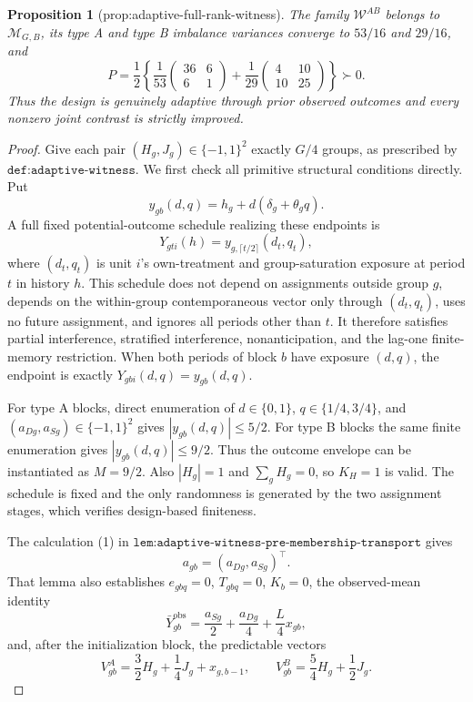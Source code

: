 \documentclass{article}
\newtheorem{proposition}{Proposition}
\begin{document}
\begin{proposition}[prop:adaptive-full-rank-witness]\label{prop:adaptive-full-rank-witness}
The family \(\mathcal W^{AB}\) belongs to \(\mathcal M_{G,B}\), its type A and type B imbalance variances converge to \(53/16\) and \(29/16\), and \[P=\frac12\left\{\frac1{53}\begin{pmatrix}36&6\\6&1\end{pmatrix}+\frac1{29}\begin{pmatrix}4&10\\10&25\end{pmatrix}\right\}\succ0.\] Thus the design is genuinely adaptive through prior observed outcomes and every nonzero joint contrast is strictly improved.
\end{proposition}
\begin{proof}
Give each pair \((H_g,J_g)\in\{-1,1\}^2\) exactly \(G/4\) groups, as prescribed by \(\texttt{def:adaptive-witness}\).  We first check all primitive structural conditions directly.  Put
\[
y_{gb}(d,q)=h_g+d(\delta_g+\theta_gq).
\]
A full fixed potential-outcome schedule realizing these endpoints is
\[
Y_{gti}(h)=y_{g,\lceil t/2\rceil}(d_t,q_t),
\]
where \((d_t,q_t)\) is unit \(i\)'s own-treatment and group-saturation exposure at period \(t\) in history \(h\).  This schedule does not depend on assignments outside group \(g\), depends on the within-group contemporaneous vector only through \((d_t,q_t)\), uses no future assignment, and ignores all periods other than \(t\).  It therefore satisfies partial interference, stratified interference, nonanticipation, and the lag-one finite-memory restriction.  When both periods of block \(b\) have exposure \((d,q)\), the endpoint is exactly \(Y_{gbi}(d,q)=y_{gb}(d,q)\).

For type A blocks, direct enumeration of \(d\in\{0,1\}\), \(q\in\{1/4,3/4\}\), and \((a_{Dg},a_{Sg})\in\{-1,1\}^2\) gives \(|y_{gb}(d,q)|\leq5/2\).  For type B blocks the same finite enumeration gives \(|y_{gb}(d,q)|\leq9/2\).  Thus the outcome envelope can be instantiated as \(M=9/2\).  Also \(|H_g|=1\) and \(\sum_gH_g=0\), so \(K_H=1\) is valid.  The schedule is fixed and the only randomness is generated by the two assignment stages, which verifies design-based finiteness.

The calculation (1) in \(\texttt{lem:adaptive-witness-pre-membership-transport}\) gives
\[
a_{gb}=(a_{Dg},a_{Sg})^\top.                              \tag{16}
\]
That lemma also establishes \(e_{gbq}=0\), \(T_{gbq}=0\), \(K_b=0\), the observed-mean identity
\[
\bar Y^{\mathrm{obs}}_{gb}
=\frac{a_{Sg}}2+\frac{a_{Dg}}4+\frac L4x_{gb},            \tag{17}
\]
and, after the initialization block, the predictable vectors
\[
V_{gb}^{A}=\frac32H_g+\frac14J_g+x_{g,b-1},
\qquad
V_{gb}^{B}=\frac54H_g+\frac12J_g.                        \tag{18}
\]


\end{proof}
\end{document}
